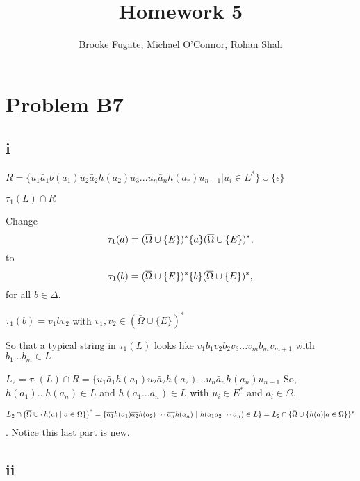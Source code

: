 \documentclass[12pt]{article}
\begin{document}
\pagestyle{plain}
\titleformat{\subsection}[runin]
  {\normalfont\large\bfseries}{\thesubsection}{1em}{}

\title{Homework 5}
\author{Brooke Fugate, Michael O'Connor, Rohan Shah}
\date{}

\maketitle

\section*{Problem B7}
\subsection*{i}
$R = \{u_1 \bar a_1 b(a_1)u_2 \bar a_2h(a_2)u_3...u_n \bar a_nh(a_r)u_{n+1} | u_i \in E^* \} \cup \{\epsilon\}$

$\tau_1(L) \cap R$

Change
$$\tau_1(a) = (\overline{\Omega}\cup\{E\})^*\{a\}(\overline{\Omega}\cup\{E\})^*,$$ to
$$\tau_1(b) = (\overline{\Omega}\cup\{E\})^*\{b\}(\overline{\Omega}\cup\{E\})^*,$$
for all $b\in \Delta$.

$\tau_1(b) = v_1bv_2$ with $v_1,v_2 \in (\bar \Omega \cup \{E\})^*$

So that a typical string in $\tau_1(L)$ looks like $v_1b_1v_2b_2v_3...v_mb_mv_{m+1}$ with $b_1...b_m \in L$

$L_2 = \tau_1(L) \cap R = \{u_1\bar a_1h(a_1)u_2\bar a_2 h(a_2)...u_n \bar a_n h(a_n) u_{n+1}$ So, $h(a_1)...h(a_n) \in L$ and $h(a_1...a_n) \in L$ with $u_i \in E^*$ and $a_i \in \Omega$.

$$L_2\cap \left(\overline{\Omega}\cup \{h(a) \mid a\in\Omega\}\right)^*
=\{\overline{a_1}h(a_1) \overline{a_2}h(a_2)\cdots \overline{a_n}h(a_n)\ |\
h(a_1a_2\cdots a_n)\in L\}  = L_2 \cap \{\bar \Omega \cup \{h(a) | a \in \Omega 
\}\}^*$$. Notice this last part is new.

\subsection*{ii}
\end{document}
